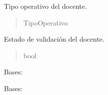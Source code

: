 \documentclass[letterpaper,10pt,spanish]{sphinxmanual}
\begin{document}
\begin{fulllineitems}
\begin{fulllineitems}
\begin{quote}
\begin{description}
\end{description}\end{quote}

\end{fulllineitems}



\begin{fulllineitems}

\pysigstartsignatures
{}
\pysigstopsignatures
\sphinxAtStartPar
Tipo operativo del docente.
\begin{quote}\begin{description}
\sphinxAtStartPar
TipoOperativo

\end{description}\end{quote}

\end{fulllineitems}



\begin{fulllineitems}

\pysigstartsignatures
{}
\pysigstopsignatures
\sphinxAtStartPar
Estado de validación del docente.
\begin{quote}\begin{description}
\sphinxAtStartPar
bool

\end{description}\end{quote}

\end{fulllineitems}



\begin{fulllineitems}

\pysigstartsignatures
{}
\pysigstopsignatures
\sphinxAtStartPar
Bases: 

\end{fulllineitems}



\begin{fulllineitems}

\pysigstartsignatures
{}
\pysigstopsignatures
\sphinxAtStartPar
Bases: 


\end{fulllineitems}
\end{fulllineitems}
\end{document}
